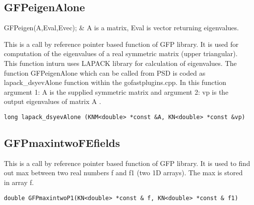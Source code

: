 \subsection{GFPeigenAlone}

\begin{conditions*}
GFPeigen(A,Eval,Evec); & {\ttfamily A} is a matrix, {\ttfamily Eval} is vector returning eigenvalues.
\end{conditions*}

This is a call by reference pointer based function of GFP library. It is used for computation of the eigenvalues of a real symmetric matrix (upper triangular). This function inturn uses LAPACK library for calculation of eigenvalues. The function {\ttfamily GFPeigenAlone} which can be called from PSD is coded as {\ttfamily lapack\_dsyevAlone} function within the gofastplugins.cpp. In this function argument 1: {\ttfamily A} is the supplied symmetric matrix and argument 2: {\ttfamily vp}  is the output eigenvalues of matrix {\ttfamily A} .
\begin{lstlisting}[language=PSD]
long lapack_dsyevAlone (KNM<double> *const &A, KN<double> *const &vp)
\end{lstlisting}

\subsection{GFPmaxintwoFEfields}
This is a call by reference pointer based function of GFP library. It is used to find out max between two real numbers {\ttfamily f} and {\ttfamily f1} (two 1D arrays). The max is stored in array {\ttfamily f}.
\begin{lstlisting}[language=PSD]
double GFPmaxintwoP1(KN<double> *const & f, KN<double> *const & f1)
\end{lstlisting}

